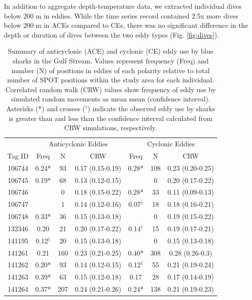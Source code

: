 In addition to aggregate depth-temperature data, we extracted individual dives below 200 m in eddies. While the time series record contained 2.5x more dives below 200 m in ACEs compared to CEs, there was no significant difference in the depth or duration of dives between the two eddy types (Fig. \cref{fig:dives}).

\begin{table}
\caption[Summary of anticyclonic and cyclonic eddy use by blue sharks in the Gulf Stream]{Summary of anticyclonic (ACE) and cyclonic (CE) eddy use by blue sharks in the Gulf Stream. Values represent frequency (Freq) and number (N) of positions in eddies of each polarity relative to total number of SPOT positions within the study area for each individual. Correlated random walk (CRW) values show frequency of eddy use by simulated random movements as mean mean (confidence interval). Asterisks (*) and crosses ($^{\dagger}$) indicate the observed eddy use by sharks is greater than and less than the confidence interval calculated from CRW simulations, respectively.}
\label{tab:c5t2}
\centering
\begin{tabular}[t]{ccccccc}
\toprule
 & \multicolumn{3}{c}{Anticyclonic Eddies} & \multicolumn{3}{c}{Cyclonic Eddies} \\
Tag ID & Freq & N & CRW & Freq & N & CRW\\
\midrule
106744 & 0.24* & 93 & 0.17 (0.15-0.19) & 0.28* & 108 & 0.23 (0.20-0.25)\\
106745 & 0.19* & 68 & 0.13 (0.12-0.15) &  & 0 & 0.20 (0.17-0.22)\\
106746 &  & 0 & 0.18 (0.15-0.22) & 0.28* & 33 & 0.11 (0.09-0.13)\\
106747 &  & 1 & 0.14 (0.12-0.16) & 0.07$^{\dagger}$ & 18 & 0.18 (0.16-0.21)\\
106748 & 0.33* & 36 & 0.15 (0.13-0.18) &  & 0 & 0.19 (0.15-0.22)\\
132346 & 0.20 & 21 & 0.20 (0.17-0.22) & 0.14$^{\dagger}$ & 15 & 0.19 (0.17-0.21)\\
141195 & 0.12$^{\dagger}$ & 20 & 0.15 (0.13-0.18) &  & 0 & 0.15 (0.13-0.18)\\
141261 & 0.21 & 160 & 0.23 (0.21-0.25) & 0.40* & 308 & 0.28 (0.26-0.3)\\
141262 & 0.20* & 93 & 0.14 (0.12-0.15) & 0.12$^{\dagger}$ & 55 & 0.21 (0.19-0.24)\\
141263 & 0.39* & 63 & 0.15 (0.12-0.18) & 0.17 & 28 & 0.17 (0.14-0.19)\\
141264 & 0.37* & 207 & 0.24 (0.21-0.26) & 0.24* & 138 & 0.21 (0.19-0.23)\\

\end{tabular}
\end{table}
